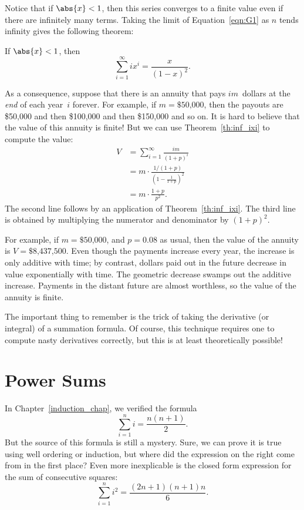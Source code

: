 Notice that if $\abs{x} < 1$, then this series converges to a finite
value even if there are infinitely many terms.  Taking the limit of
Equation~\ref{eqn:G1} as $n$ tends infinity gives the following
theorem:
\begin{theorem}\label{th:inf_ixi}
If $\abs{x} < 1$, then
\[
    \sum_{i=1}^\infty i x^i = \frac{x}{(1-x)^2}.
\]
\end{theorem}

As a consequence, suppose that there is an annuity that pays
$im$~dollars at the \emph{end} of each year~$i$ forever.  For example,
if $m = \text{\$50,000}$, then the payouts are \$50,000 and then
\$100,000 and then \$150,000 and so on.  It is hard to believe
that the value of this annuity is finite!  But we can use
Theorem~\ref{th:inf_ixi} to compute the value:
\begin{align*}
V & = \sum_{i=1}^\infty \frac{im}{(1+p)^i} \\
  & = m \cdot \frac{1/(1+p)}{(1 - \frac{1}{1+p})^2} \\
  & = m \cdot \frac{1+p}{p^2}.
\end{align*}
The second line follows by an application of Theorem~\ref{th:inf_ixi}.
The third line is obtained by multiplying the numerator and
denominator by $(1+p)^2$.

For example, if $m = \text{\$50,000}$, and $p = 0.08$ as usual, then
the value of the annuity is $V = \text{\$8,437,500}$.  Even though the
payments increase every year, the increase is only additive with time;
by contrast, dollars paid out in the future decrease in value
exponentially with time.  The geometric decrease swamps out the
additive increase.  Payments in the distant future are almost
worthless, so the value of the annuity is finite.

The important thing to remember is the trick of taking the derivative
(or integral) of a summation formula.  Of course, this technique
requires one to compute nasty derivatives correctly, but this is at
least theoretically possible!

\section{Power Sums}

In Chapter~\ref{induction_chap}, we verified the formula
\begin{equation}\label{eqn:G26}
    \sum_{i = 1}^n i = \frac{n (n + 1)}{2}.
\end{equation}
But the source of this formula is still a mystery.  Sure, we can prove
it is true using well ordering or induction, but where did the
expression on the right come from in the first place?  Even more
inexplicable is the closed form expression for the sum of consecutive
squares:
\begin{equation}\label{eqn:G27}
    \sum_{i = 1}^n i^2 = \frac{(2n+1) (n+1) n}{6}.
\end{equation}

